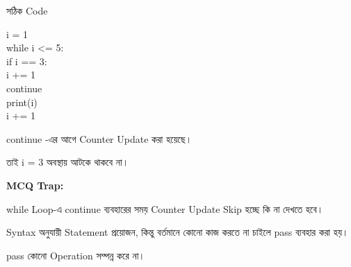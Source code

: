\begin{codeoutputbox}{সঠিক Code}

\noindent
\begin{minipage}[t]{0.54\linewidth}
\codeheading

\begin{english}
\ttfamily
i = 1\\
while i <= 5:\\
\hspace*{4mm}if i == 3:\\
\hspace*{8mm}i += 1\\
\hspace*{8mm}continue\\
\hspace*{4mm}print(i)\\
\hspace*{4mm}i += 1
\end{english}

\end{minipage}
\hfill
\begin{minipage}[t]{0.42\linewidth}
\outputheading

\textenglish{\ttfamily continue}
-এর আগে Counter Update করা হয়েছে।

তাই
\textenglish{\ttfamily i = 3}
অবস্থায় আটকে থাকবে না।

\medskip

\textbf{\color{deepOrange}MCQ Trap:}

\textenglish{\ttfamily while}
Loop-এ
\textenglish{\ttfamily continue}
ব্যবহারের সময় Counter Update Skip হচ্ছে কি না দেখতে হবে।

\end{minipage}

\end{codeoutputbox}



Syntax অনুযায়ী Statement প্রয়োজন, কিন্তু বর্তমানে কোনো কাজ করতে না চাইলে
\textenglish{\ttfamily pass}
ব্যবহার করা হয়।

\textenglish{\ttfamily pass}
কোনো Operation সম্পন্ন করে না।

